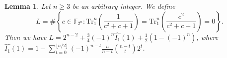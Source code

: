\documentclass{article}
\newcommand{\F}{\mathbb{F}}
\newtheorem{lemma}{Lemma}
\theoremstyle{nonumberplain}
\newcommand{\0}{\textbf{0}}
\newcommand{\1}{\textbf{1}}
\begin{document}



\begin{lemma}\label{L:SumInv00}
Let $n\geq 3$ be an arbitrary integer. We define
$$L=\#\left\{c\in\F_{2^n} : \mathrm{Tr}_1^n\left(\frac{1}{c^2+c+1}\right)=\mathrm{Tr}_1^n\left(\frac{c^2}{c^2+c+1}\right)=0\right\}.$$
Then we have $L=2^{n-2}+\frac{3}{4}(-1)^n\widehat{I_1}(1)+\frac{1}{2}\left(1-(-1)^n\right)$, where $ \widehat{I_1}(1)=1-\sum_{t=0}^{\lfloor n/2\rfloor}(-1)^{n-t}\frac{n}{n-t}{{n-t}\choose {t}}2^t $.
\end{lemma}
\end{document}
